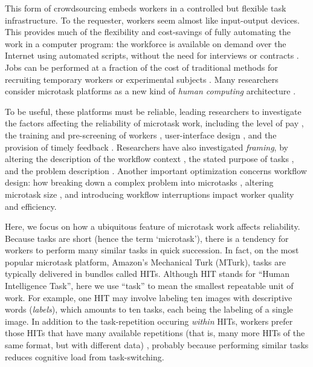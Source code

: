 \documentclass{pnastwo}
\begin{document}
\begin{article}
This form of crowdsourcing embeds workers in a controlled but flexible
task infrastructure.  To the requester, workers seem almost like input-output 
devices.  
This provides much of the flexibility and 
cost-savings of fully automating the work in a computer program: 
the workforce is available on demand over the Internet using automated 
scripts, without the need for interviews or contracts 
\cite{wolfson2011look,5543192}.
Jobs can be performed at a fraction of the cost of traditional methods for 
recruiting temporary workers or experimental subjects
\cite{Berinsky2012351}. %
Many researchers consider microtask platforms 
as a new kind of \textit{human computing} architecture
\cite{5543192}. %

To be useful, these platforms must be reliable, leading researchers to investigate the factors affecting the reliability
of microtask work, including
the level of pay \cite{Mason200977,kazai2013analysis}, 
the training and pre-screening of workers 
\cite{le2010ensuring,kazai2013analysis}, %
user-interface design \cite{Finnerty2013}, and the provision of timely 
feedback \cite{Dow20121013}.
Researchers have also investigated \textit{framing}, 
by altering the description of the workflow context 
\cite{Kinnaird2012281}, the stated purpose of tasks 
\cite{chandler2013breaking}, and the problem description
\cite{thibodeau2013natural}.  Another important optimization concerns
workflow design: how breaking down a complex problem into microtasks
\cite{kittur2011crowdforge}, altering microtask size 
\cite{Huang201077}, and introducing workflow interruptions 
\cite{laseckieffects} impact worker quality and efficiency.

Here, we focus on how a ubiquitous feature of microtask work affects reliability. Because tasks are short (hence the term `microtask'), there is a tendency for workers to perform many similar tasks in quick succession.  In fact, on the most popular microtask platform, Amazon's Mechanical Turk (MTurk),
tasks are typically delivered in bundles called HITs.
Although HIT stands for ``Human Intelligence Task'', here we use ``task'' to 
mean the smallest repeatable unit of work.  For example, one HIT may involve 
labeling ten images with descriptive words (\textit{labels}), which amounts
to ten tasks, each being the labeling of a single image.
In addition to the task-repetition occuring \textit{within} HITs, 
workers prefer those HITs that have many available repetitions (that is,
many more HITs of the same format, but with different data) 
\cite{Chilton20101}, probably because performing similar tasks reduces 
cognitive load from task-switching\cite{Adamczyk2004271}.


\end{article}
\end{document}
